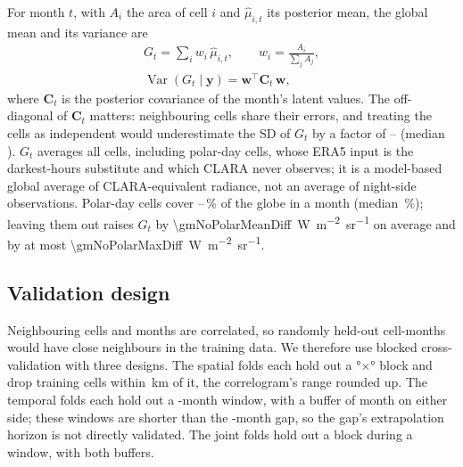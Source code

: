 \documentclass[10pt,twocolumn,a4paper]{article}
\newcommand{\clara}[1]{\SI{#1}{W.m^{-2}.sr^{-1}}}
\begin{document}
For month $t$, with $A_i$ the area of cell $i$ and $\hat\mu_{i,t}$ its posterior mean, the global mean and its variance are
\begin{equation}
\begin{gathered}
G_t=\sum_i w_i\,\hat\mu_{i,t},\qquad w_i=\frac{A_i}{\sum_j A_j},\\
\operatorname{Var}(G_t\mid\mathbf{y})=\mathbf{w}^\top\mathbf{C}_t\,\mathbf{w},
\end{gathered}
\label{eq:globalmean}
\end{equation}
where $\mathbf{C}_t$ is the posterior covariance of the month's latent values. The off-diagonal of $\mathbf{C}_t$ matters: neighbouring cells share their errors, and treating the cells as independent would underestimate the SD of $G_t$ by a factor of \sdRatioMin--\sdRatioMax{} (median \sdRatioMedian). $G_t$ averages all \nCells{} cells, including polar-day cells, whose ERA5 input is the darkest-hours substitute and which CLARA never observes; it is a model-based global average of CLARA-equivalent radiance, not an average of night-side observations. Polar-day cells cover \polarShareMin--\polarShareMax\,\% of the globe in a month (median \polarShareMedian\,\%); leaving them out raises $G_t$ by \clara{\gmNoPolarMeanDiff} on average and by at most \clara{\gmNoPolarMaxDiff}.

\subsection{Validation design}\label{sec:cv}
Neighbouring cells and months are correlated, so randomly held-out cell-months would have close neighbours in the training data. We therefore use blocked cross-validation \cite{roberts2017blockcv} with three designs. The \nFoldsSpatial{} spatial folds each hold out a \cvBlockDeg°$\times$\cvBlockDeg° block and drop training cells within \cvBufferKm\,km of it, the correlogram's range rounded up. The \nFoldsTemporal{} temporal folds each hold out a \cvWindowMonths-month window, with a buffer of \cvBufferMonths{} month on either side; these windows are shorter than the \gapMonths-month gap, so the gap's extrapolation horizon is not directly validated. The \nFoldsJoint{} joint folds hold out a block during a window, with both buffers.
\end{document}
